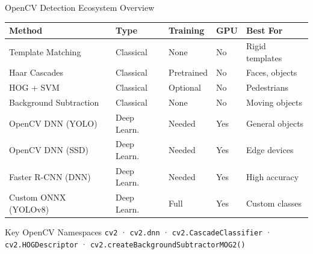 \documentclass[aspectratio=169]{beamer}
\begin{document}
\begin{frame}{OpenCV Detection Ecosystem Overview}
  \begin{center}
  \small
  \begin{tabular}{lllll}
    \toprule
    \textbf{Method} & \textbf{Type} & \textbf{Training} & \textbf{GPU} & \textbf{Best For}\\
    \midrule
    Template Matching   & Classical & None        & No  & Rigid templates\\
    Haar Cascades       & Classical & Pretrained  & No  & Faces, objects\\
    HOG + SVM           & Classical & Optional    & No  & Pedestrians\\
    Background Subtraction & Classical & None     & No  & Moving objects\\
    OpenCV DNN (YOLO)   & Deep Learn. & Needed    & Yes & General objects\\
    OpenCV DNN (SSD)    & Deep Learn. & Needed    & Yes & Edge devices\\
    Faster R-CNN (DNN)  & Deep Learn. & Needed    & Yes & High accuracy\\
    Custom ONNX (YOLOv8) & Deep Learn. & Full     & Yes & Custom classes\\
    \bottomrule
  \end{tabular}
  \end{center}
  \begin{block}{Key OpenCV Namespaces}
    \texttt{cv2} · \texttt{cv2.dnn} · \texttt{cv2.CascadeClassifier} ·
    \texttt{cv2.HOGDescriptor} · \texttt{cv2.createBackgroundSubtractorMOG2()}
  \end{block}
\end{frame}
\end{document}
